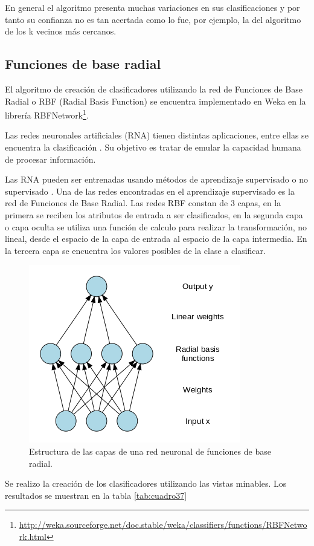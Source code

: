 En general el algoritmo presenta muchas variaciones en sus clasificaciones y por tanto su confianza no es tan acertada como lo fue, por ejemplo, la del algoritmo de los k vecinos más cercanos.
\subsection{Funciones de base radial}
El algoritmo de creación de clasificadores utilizando la red de Funciones de Base Radial o RBF (Radial Basis Function) se encuentra implementado en Weka en la librería RBFNetwork\footnote{\url{ http://weka.sourceforge.net/doc.stable/weka/classifiers/functions/RBFNetwork.html}}.

Las redes neuronales artificiales (RNA) tienen distintas aplicaciones, entre ellas se encuentra la clasificación \cite{key-250}. Su objetivo es tratar de emular la capacidad humana de procesar información.  

Las RNA pueden ser entrenadas usando métodos de aprendizaje supervisado o no supervisado \cite{key-240}. Una de las redes encontradas en el aprendizaje supervisado es la red de Funciones de Base Radial. Las redes RBF constan de 3 capas, en la primera se reciben los atributos de entrada a ser clasificados, en la segunda capa o capa oculta se utiliza una función de calculo para realizar la transformación, no lineal, desde el espacio de la capa de entrada al espacio de la capa intermedia. En la tercera capa se encuentra los valores posibles de la clase a clasificar. 

\begin{figure}[H]
\begin{centering}
\includegraphics[scale=0.6]{rbf}
\par\end{centering}
\caption{Estructura de las capas de una red neuronal de funciones de base radial.}
\end{figure}
Se realizo la creación de los clasificadores utilizando las vistas minables. Los resultados se muestran en la tabla \ref{tab:cuadro37}

